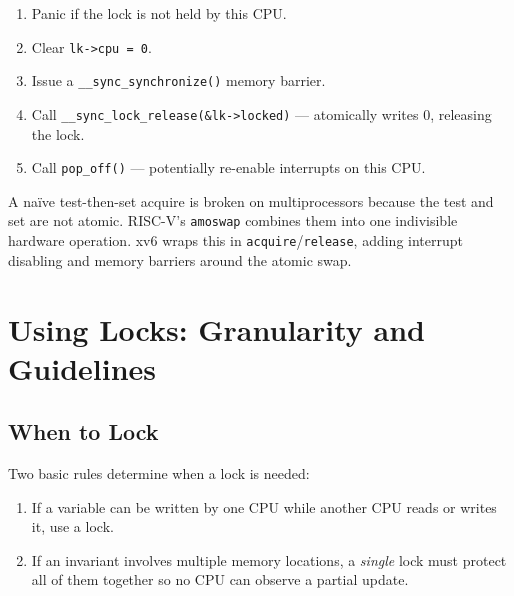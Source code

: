 \documentclass[11pt, a4paper]{article}
\begin{document}
\begin{tcolorbox}[spinlock, title={Spinlock: release (kernel/spinlock.c:47)}]
\begin{enumerate}[leftmargin=1.8em, itemsep=0.2em]
  \item Panic if the lock is not held by this CPU.
  \item Clear \lstinline|lk->cpu = 0|.
  \item Issue a \lstinline|__sync_synchronize()| memory barrier.
  \item Call \lstinline|__sync_lock_release(&lk->locked)| --- atomically writes 0, releasing the lock.
  \item Call \lstinline|pop_off()| --- potentially re-enable interrupts on this CPU.
\end{enumerate}
\end{tcolorbox}

\begin{tcolorbox}[summary, title={Section Summary}]
A naïve test-then-set acquire is broken on multiprocessors because the test and set are not atomic. RISC-V's \lstinline|amoswap| combines them into one indivisible hardware operation. xv6 wraps this in \lstinline|acquire|/\lstinline|release|, adding interrupt disabling and memory barriers around the atomic swap.
\end{tcolorbox}

\section{Using Locks: Granularity and Guidelines}

\subsection{When to Lock}

Two basic rules determine when a lock is needed:

\begin{enumerate}[leftmargin=2em]
  \item If a variable can be written by one CPU while another CPU reads or writes it, use a lock.
  \item If an invariant involves multiple memory locations, a \emph{single} lock must protect all of them together so no CPU can observe a partial update.
\end{enumerate}
\end{document}
